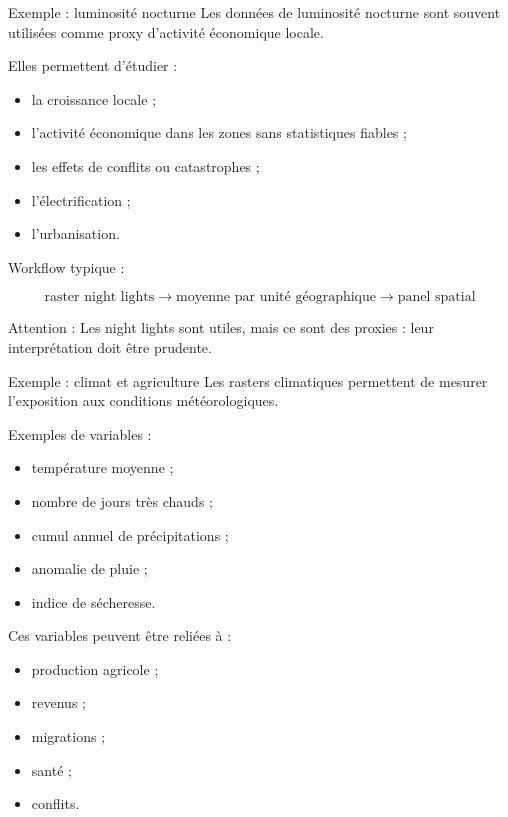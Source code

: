 \documentclass[
  10pt,
  ignorenonframetext,
]{beamer}
\begin{document}
\begin{frame}{Exemple : luminosité nocturne}
\label{exemple-luminosituxe9-nocturne}
Les données de luminosité nocturne sont souvent utilisées comme proxy
d'activité économique locale.

Elles permettent d'étudier :

\begin{itemize}
  \item la croissance locale ;
  \item l’activité économique dans les zones sans statistiques fiables ;
  \item les effets de conflits ou catastrophes ;
  \item l’électrification ;
  \item l’urbanisation.
\end{itemize}

Workflow typique :

\[
\text{raster night lights}
\rightarrow
\text{moyenne par unité géographique}
\rightarrow
\text{panel spatial}
\]

Attention : Les night lights sont utiles, mais ce sont des proxies :
leur interprétation doit être prudente.
\end{frame}

\begin{frame}{Exemple : climat et agriculture}
\label{exemple-climat-et-agriculture}
Les rasters climatiques permettent de mesurer l'exposition aux
conditions météorologiques.

Exemples de variables :

\begin{itemize}
  \item température moyenne ;
  \item nombre de jours très chauds ;
  \item cumul annuel de précipitations ;
  \item anomalie de pluie ;
  \item indice de sécheresse.
\end{itemize}

Ces variables peuvent être reliées à :

\begin{itemize}
  \item production agricole ;
  \item revenus ;
  \item migrations ;
  \item santé ;
  \item conflits.
\end{itemize}
\end{frame}
\end{document}
